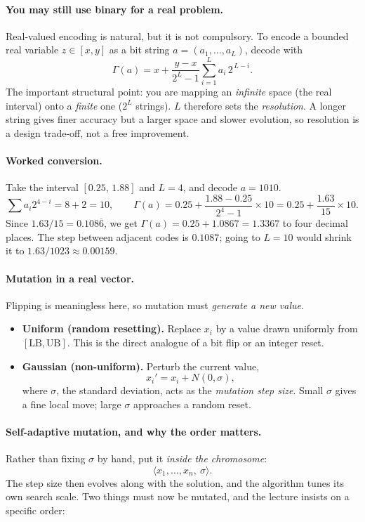 \documentclass[11pt,a4paper]{article}
\begin{document}
\paragraph{You may still use binary for a real problem.}
Real-valued encoding is natural, but it is not compulsory. To encode a
bounded real variable $z\in[x,y]$ as a bit string $a=(a_1,\ldots,a_L)$,
decode with
\[
  \Gamma(a)=x+\frac{y-x}{2^{L}-1}\sum_{i=1}^{L}a_i\,2^{\,L-i}.
\]
The important structural point: you are mapping an \emph{infinite} space (the
real interval) onto a \emph{finite} one ($2^L$ strings). $L$ therefore sets
the \emph{resolution}. A longer string gives finer accuracy but a larger
space and slower evolution, so resolution is a design trade-off, not a free
improvement.

\paragraph{Worked conversion.}
Take the interval $[0.25,\,1.88]$ and $L=4$, and decode $a=1010$.
\[
  \sum a_i2^{4-i}=8+2=10,\qquad
  \Gamma(a)=0.25+\frac{1.88-0.25}{2^4-1}\times 10
          =0.25+\frac{1.63}{15}\times 10 .
\]
Since $1.63/15=0.108\overline{6}$, we get $\Gamma(a)=0.25+1.0867=1.3367$ to
four decimal places. The step between adjacent codes is $0.1087$; going to
$L=10$ would shrink it to $1.63/1023\approx0.00159$.

\paragraph{Mutation in a real vector.}
Flipping is meaningless here, so mutation must \emph{generate a new value}.
\begin{itemize}
\item \textbf{Uniform (random resetting).} Replace $x_i$ by a value drawn
      uniformly from $[\mathrm{LB},\mathrm{UB}]$. This is the direct analogue
      of a bit flip or an integer reset.
\item \textbf{Gaussian (non-uniform).} Perturb the current value,
      \[
        x_i'=x_i+N(0,\sigma),
      \]
      where $\sigma$, the standard deviation, acts as the \emph{mutation step
      size}. Small $\sigma$ gives a fine local move; large $\sigma$
      approaches a random reset.
\end{itemize}

\paragraph{Self-adaptive mutation, and why the order matters.}
Rather than fixing $\sigma$ by hand, put it \emph{inside the chromosome}:
\[
  \langle x_1,\ldots,x_n,\ \sigma\rangle .
\]
The step size then evolves along with the solution, and the algorithm tunes
its own search scale. Two things must now be mutated, and the lecture insists
on a specific order:
\end{document}

